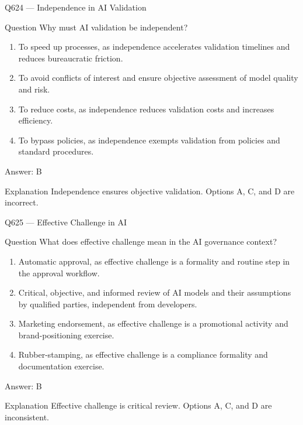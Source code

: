 \documentclass[aspectratio=169,8pt]{beamer}
\begin{document}
	\begin{frame}{Q624 --- Independence in AI Validation}
		\begin{block}{Question}
			Why must AI validation be independent?
			\begin{enumerate}
				\item To speed up processes, as independence accelerates validation timelines and reduces bureaucratic friction.
				\item To avoid conflicts of interest and ensure objective assessment of model quality and risk.
				\item To reduce costs, as independence reduces validation costs and increases efficiency.
				\item To bypass policies, as independence exempts validation from policies and standard procedures.
			\end{enumerate}
		\end{block}
		\begin{exampleblock}{Answer: B}\end{exampleblock}
		\begin{block}{Explanation}
			Independence ensures objective validation. Options A, C, and D are incorrect.
		\end{block}
	\end{frame}
	
	\begin{frame}{Q625 --- Effective Challenge in AI}
		\begin{block}{Question}
			What does effective challenge mean in the AI governance context?
			\begin{enumerate}
				\item Automatic approval, as effective challenge is a formality and routine step in the approval workflow.
				\item Critical, objective, and informed review of AI models and their assumptions by qualified parties, independent from developers.
				\item Marketing endorsement, as effective challenge is a promotional activity and brand-positioning exercise.
				\item Rubber-stamping, as effective challenge is a compliance formality and documentation exercise.
			\end{enumerate}
		\end{block}
		\begin{exampleblock}{Answer: B}\end{exampleblock}
		\begin{block}{Explanation}
			Effective challenge is critical review. Options A, C, and D are inconsistent.
		\end{block}
	\end{frame}
	
\end{document}
